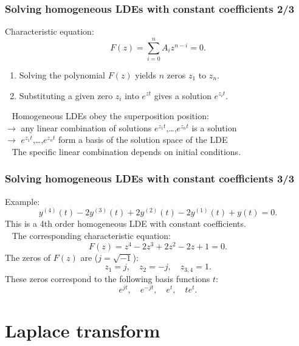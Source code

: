 \begin{frame}
\frametitle{Solving homogeneous LDEs with constant coefficients 2/3}
Characteristic equation:
\begin{equation*}
F(z) = \sum_{i=0}^n A_i z^{n-i} = 0.
\end{equation*}
\pause
\begin{enumerate}
\item Solving the polynomial $F(z)$ yields $n$ zeros $z_1$ to $z_n$.
\item Substituting a given zero $z_i$ into $e^{zt}$ gives a solution $e^{z_it}$.
\end{enumerate}
\ \newline
\pause
Homogeneous LDEs obey the superposition position: \\
$\rightarrow$ any linear combination of solutions $e^{z_1t}$,\ldots,$e^{z_nt}$ is a solution \pause \\
$\rightarrow$ $e^{z_1t}$,\ldots,$e^{z_nt}$ form a basis of the solution space of the LDE \\
\pause 
\ \newline
The specific linear combination depends on initial conditions.
\end{frame}


\begin{frame}
\frametitle{Solving homogeneous LDEs with constant coefficients 3/3}
Example:
\begin{equation*}
y^{(4)}(t) - 2 y^{(3)}(t) + 2 y^{(2)}(t) - 2 y^{(1)}(t) + y(t) = 0.
\end{equation*}
\pause
This is a 4th order homogeneous LDE with constant coefficients.\\
\ \newline
\pause
The corresponding characteristic equation:
\begin{equation*}
F(z) = z^4 - 2z^3 + 2z^2 - 2 z + 1 = 0.
\end{equation*}
\pause
The zeros of $F(z)$ are ($j=\sqrt{-1}$):
\begin{equation*}
z_1 = j, \quad z_2 = -j, \quad z_{3, 4} = 1.
\end{equation*}
\pause
These zeros correspond to the following basis functions $t$:
\begin{equation*}
 e^{jt}, \quad e^{-jt}, \quad e^t, \quad te^t.
\end{equation*}
\end{frame}

\section{Laplace transform}

